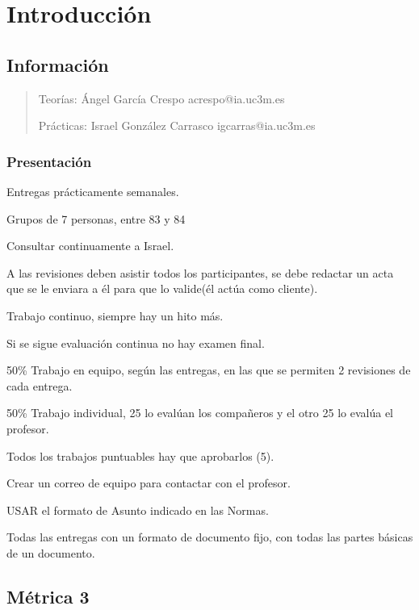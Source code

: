 \documentclass[12pt, twoside, openright]{report} %
\begin{document}
\clearpage
{} %



\part{Introducción}

\chapter{Información}

\begin{quote}
Teorías: Ángel García Crespo acrespo@ia.uc3m.es

Prácticas: Israel González Carrasco igcarras@ia.uc3m.es
\end{quote}

\section{Presentación}

Entregas prácticamente semanales.

Grupos de 7 personas, entre 83 y 84

Consultar continuamente a Israel.

A las revisiones deben asistir todos los participantes, se debe redactar
un acta que se le enviara a él para que lo valide(él actúa como cliente).

Trabajo continuo, siempre hay un hito más.

Si se sigue evaluación continua no hay examen final.

50\% Trabajo en equipo, según las entregas, en las que se permiten 2
revisiones de cada entrega.

50\% Trabajo individual, 25 lo evalúan los compañeros y el otro 25 lo
evalúa el profesor.

Todos los trabajos puntuables hay que aprobarlos (5).

Crear un correo de equipo para contactar con el profesor.

USAR el formato de Asunto indicado en las Normas.

Todas las entregas con un formato de documento fijo, con todas las
partes básicas de un documento.

\chapter{Métrica 3}
\end{document}
